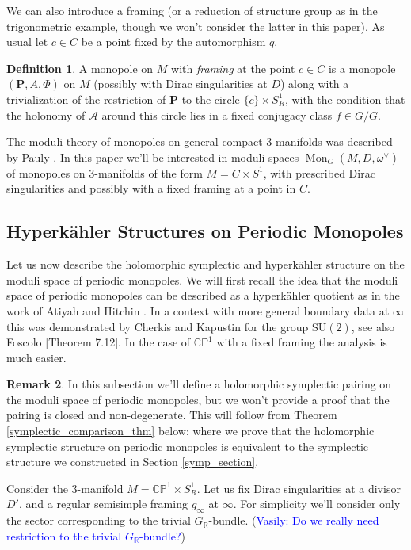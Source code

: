 \documentclass[11pt, oneside, reqno]{amsart}
\theoremstyle{definition} \newtheorem{definition}{Definition}[section]
\theoremstyle{definition} \newtheorem{remark}[definition]{Remark}
\theoremstyle{definition} \newtheorem{remarks}[definition]{Remarks}
\theoremstyle{definition} \newtheorem{question}[definition]{Question}
\theoremstyle{definition} \newtheorem*{note}{Note}
\theoremstyle{definition} \newtheorem{example}[definition]{Example}
\theoremstyle{definition} \newtheorem{examples}[definition]{Examples}
\newcommand{\bb}[1]{\mathbb{#1}}
\newcommand{\mc}[1]{\mathcal{#1}}
\newcommand{\bo}[1]{\boldsymbol{#1}}
\newcommand{\RR}{\mathbb{R}}
\newcommand{\SU}{\mathrm{SU}}
\DeclareMathOperator{\mon}{Mon}
\newcommand{\vasily}[1]{(\textcolor{blue}{Vasily: #1})}
\begin{document}
We can also introduce a framing (or a reduction of structure group as in the trigonometric example, though we won't consider the latter in this paper).  As usual let $c \in C$ be a point fixed by the automorphism $q$.

\begin{definition}
A monopole on $M$ with \emph{framing} at the point $c \in C$ is a monopole $(\bo P,A,\Phi)$ on $M$ (possibly with Dirac singularities at $D$) along with a trivialization of the restriction of $\bo P$ to the circle $\{c\} \times S^1_R$, with the condition that the holonomy of $\mc A$ around this circle lies in a fixed conjugacy class $f \in G/G$.
\end{definition}

The moduli theory of monopoles on general compact 3-manifolds was described by Pauly \cite{Pauly}.  In this paper we'll be interested in moduli spaces $\mon_G(M, D, \omega^\vee)$ of monopoles on 3-manifolds of the form $M = C \times S^1$, with prescribed Dirac singularities and possibly with a fixed framing at a point in $C$.  

\subsection{Hyperk\"ahler Structures on Periodic Monopoles} \label{HK_monopole_section}
Let us now describe the holomorphic symplectic and hyperk\"ahler structure on the moduli space of periodic monopoles.  We will first recall the idea that the moduli space of periodic monopoles can be described as a hyperk\"ahler quotient as in the work of Atiyah and Hitchin \cite{AtiyahHitchin}.  In a context with more general boundary data at $\infty$ this was demonstrated by Cherkis and Kapustin \cite{CherkisKapustin3} for the group $\SU(2)$, see also Foscolo \cite{FoscoloDef}[Theorem 7.12].  In the case of $\bb{CP}^1$ with a fixed framing the analysis is much easier.

\begin{remark}
In this subsection we'll define a holomorphic symplectic pairing on the moduli space of periodic monopoles, but we won't provide a proof that the pairing is closed and non-degenerate.  This will follow from Theorem \ref{symplectic_comparison_thm} below: where we prove that the holomorphic symplectic structure on periodic monopoles is equivalent to the symplectic structure we constructed in Section \ref{symp_section}.
\end{remark}

Consider the 3-manifold $M = \bb{CP}^1 \times S^1_R$.  Let us fix Dirac singularities at a divisor $D'$, and a regular semisimple framing $g_\infty$ at $\infty$.  For simplicity we'll consider only the sector corresponding to the trivial $G_\RR$-bundle.
\vasily{Do we really need restriction to the trivial $G_{\RR}$-bundle?}
\end{document}
